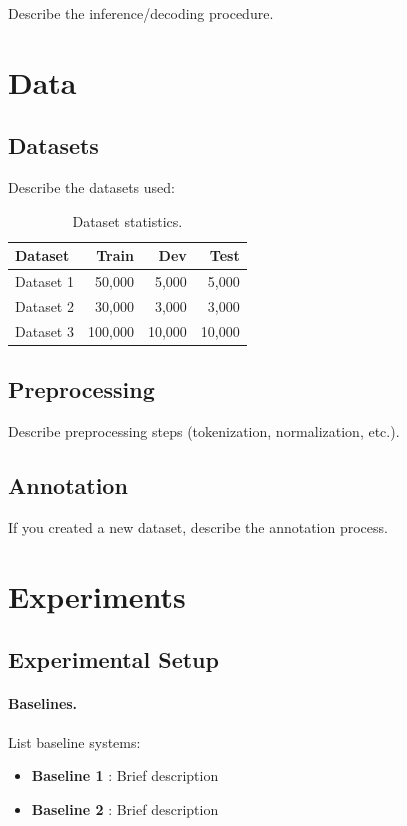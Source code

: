 \documentclass[11pt]{article}
\begin{document}
Describe the inference/decoding procedure.

\section{Data}
\label{sec:data}

\subsection{Datasets}

Describe the datasets used:

\begin{table}[t]
    \centering
    \caption{Dataset statistics.}
    \label{tab:datasets}
    \begin{tabular}{lrrr}
        \toprule
        Dataset & Train & Dev & Test \\
        \midrule
        Dataset 1 & 50,000 & 5,000 & 5,000 \\
        Dataset 2 & 30,000 & 3,000 & 3,000 \\
        Dataset 3 & 100,000 & 10,000 & 10,000 \\
        \bottomrule
    \end{tabular}
\end{table}

\subsection{Preprocessing}

Describe preprocessing steps (tokenization, normalization, etc.).

\subsection{Annotation}

If you created a new dataset, describe the annotation process.

\section{Experiments}
\label{sec:experiments}

\subsection{Experimental Setup}

\paragraph{Baselines.} List baseline systems:
\begin{itemize}
    \item \textbf{Baseline 1} \cite{ref1}: Brief description
    \item \textbf{Baseline 2} \cite{ref2}: Brief description
\end{itemize}
\end{document}
